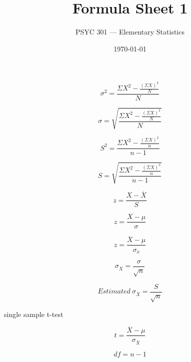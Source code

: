 \documentclass[12pt]{article}
\begin{document}
\title{Formula Sheet 1}
\author{PSYC 301 --- Elementary Statistics}
\date{\today}

\begin{equation}
	\sigma^2 = \frac{{\Sigma}X^2 - \frac{({\Sigma}X)^2}{N}}{N}
\end{equation}

\begin{equation}
	\sigma = \sqrt{\frac{{\Sigma}X^2 - \frac{({\Sigma}X)^2}{N}}{N}}
\end{equation}

\begin{equation}
	S^2 = \frac{{\Sigma}X^2 - \frac{({\Sigma}X)^2}{n}}{n-1}
\end{equation}

\begin{equation}
	S = \sqrt{\frac{{\Sigma}X^2 - \frac{({\Sigma}X)^2}{n}}{n-1}}
\end{equation}

\begin{equation}
	z = \frac{X-\overline{X}}{S}
\end{equation}

\begin{equation}
	z = \frac{X-{\mu}}{\sigma}
\end{equation}

\begin{equation}
	z = \frac{\overline{X}-{\mu}}{{\sigma}_{\overline{x}}}
\end{equation}

\begin{equation}
	{\sigma}_{\overline{X}} = \frac{\sigma}{\sqrt{n}}
\end{equation}

\clearpage

\begin{equation}
	Estimated~{\sigma}_{\overline{X}} = \frac{S}{\sqrt{n}}
\end{equation}

\vspace{12pt}

single sample t-test

\begin{equation}
	t = \frac{\overline{X}-{\mu}}{{\sigma}_{\overline{X}}}
\end{equation}

\begin{equation}
	df = n-1
\end{equation}
\end{document}

